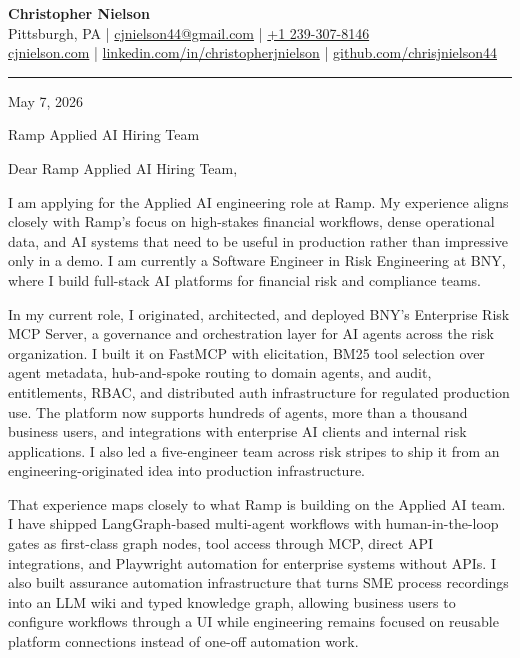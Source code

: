 \documentclass[11pt]{article}
\begin{document}
{\Large \textbf{Christopher Nielson}}\\[4pt]
Pittsburgh, PA \;|\; \href{mailto:cjnielson44@gmail.com}{cjnielson44@gmail.com} \;|\; \href{tel:+12393078146}{+1 239-307-8146}\\
\href{https://cjnielson.com}{cjnielson.com} \;|\;
\href{https://www.linkedin.com/in/christopherjnielson/}{linkedin.com/in/christopherjnielson} \;|\;
\href{https://github.com/chrisjnielson44}{github.com/chrisjnielson44}

\vspace{0.15em}
\hrule
\vspace{0.9em}

May 7, 2026

Ramp Applied AI Hiring Team

Dear Ramp Applied AI Hiring Team,

I am applying for the Applied AI engineering role at Ramp. My experience aligns closely with Ramp's focus on high-stakes financial workflows, dense operational data, and AI systems that need to be useful in production rather than impressive only in a demo. I am currently a Software Engineer in Risk Engineering at BNY, where I build full-stack AI platforms for financial risk and compliance teams.

In my current role, I originated, architected, and deployed BNY's Enterprise Risk MCP Server, a governance and orchestration layer for AI agents across the risk organization. I built it on FastMCP with elicitation, BM25 tool selection over agent metadata, hub-and-spoke routing to domain agents, and audit, entitlements, RBAC, and distributed auth infrastructure for regulated production use. The platform now supports hundreds of agents, more than a thousand business users, and integrations with enterprise AI clients and internal risk applications. I also led a five-engineer team across risk stripes to ship it from an engineering-originated idea into production infrastructure.

That experience maps closely to what Ramp is building on the Applied AI team. I have shipped LangGraph-based multi-agent workflows with human-in-the-loop gates as first-class graph nodes, tool access through MCP, direct API integrations, and Playwright automation for enterprise systems without APIs. I also built assurance automation infrastructure that turns SME process recordings into an LLM wiki and typed knowledge graph, allowing business users to configure workflows through a UI while engineering remains focused on reusable platform connections instead of one-off automation work.
\end{document}
